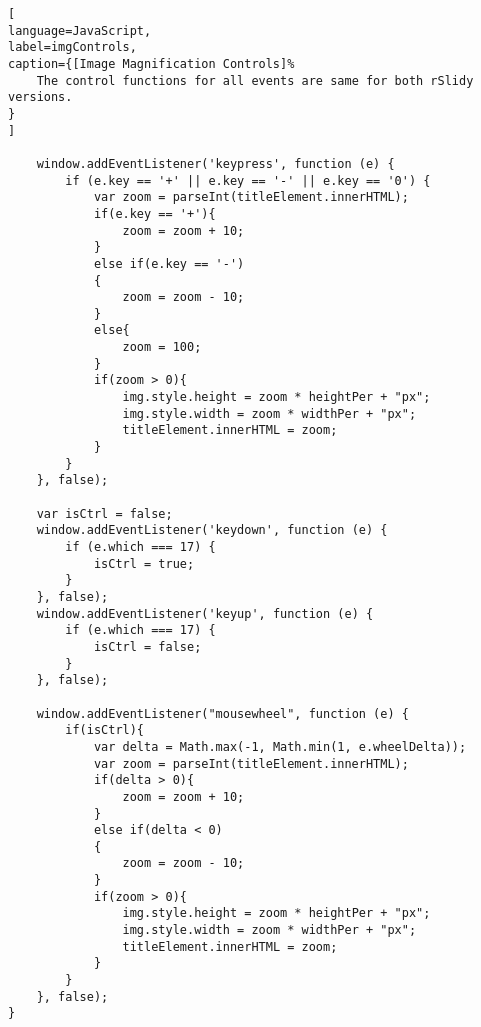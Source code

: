 \newpage

\begin{lstlisting}[
language=JavaScript,
label=imgControls,
caption={[Image Magnification Controls]%
	The control functions for all events are same for both rSlidy versions.
}
]
	
	window.addEventListener('keypress', function (e) {
		if (e.key == '+' || e.key == '-' || e.key == '0') {
			var zoom = parseInt(titleElement.innerHTML);
			if(e.key == '+'){
				zoom = zoom + 10;
			}
			else if(e.key == '-')
			{
				zoom = zoom - 10;
			}
			else{
				zoom = 100;
			}
			if(zoom > 0){
				img.style.height = zoom * heightPer + "px";
				img.style.width = zoom * widthPer + "px";
				titleElement.innerHTML = zoom;
			}
		}
	}, false);

	var isCtrl = false;
	window.addEventListener('keydown', function (e) {
		if (e.which === 17) {
            isCtrl = true;
        }
    }, false);
	window.addEventListener('keyup', function (e) {
		if (e.which === 17) {
            isCtrl = false;
        }
    }, false);

	window.addEventListener("mousewheel", function (e) {
		if(isCtrl){
			var delta = Math.max(-1, Math.min(1, e.wheelDelta));
			var zoom = parseInt(titleElement.innerHTML);
			if(delta > 0){
				zoom = zoom + 10;
			}
			else if(delta < 0)
			{
				zoom = zoom - 10;
			}
			if(zoom > 0){
				img.style.height = zoom * heightPer + "px";
				img.style.width = zoom * widthPer + "px";
				titleElement.innerHTML = zoom;
			}
		}
	}, false);
}
\end{lstlisting}